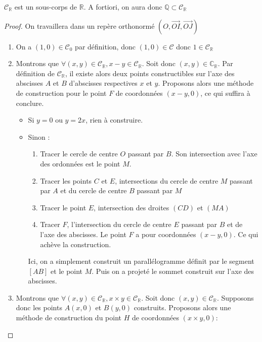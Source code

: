 \documentclass[a4paper,12pt,french,draft]{report}
\begin{document}
			
		\begin{proposition} \( \mathscr{C}_\mathbb{R} \) est un sous-corps de \(\mathbb{R}\). A fortiori, on aura donc \( \mathbb{Q} \subset \mathscr{C}_\mathbb{R} \)
		\end{proposition}
			\begin{proof}
				On travaillera dans un repère orthonormé $(O, \vec{OI}, \vec{OJ})$
				\begin{enumerate}
					\item On a $(1, 0) \in \mathscr{C}_0$ par définition, donc $(1, 0) \in \mathscr{C}$ donc $1 \in \mathscr{C}_\mathbb{R}$
					\item Montrons que $\forall (x, y) \in \mathscr{C}_\mathbb{R}, x-y \in \mathscr{C}_\mathbb{R}$. Soit donc $(x, y) \in \mathbb{C}_\mathbb{R}$. Par définition de $\mathscr{C}_\mathbb{R}$, il existe alors deux points constructibles sur l'axe des abscisses $A$ et $B$ d'abscisses respectives $x$ et $y$. Proposons alors une méthode de construction pour le point $F$ de coordonnées $(x-y, 0)$, ce qui suffira à conclure.
						\begin{itemize}
							\item Si $y = 0$ ou $y = 2x$, rien à construire.
							\item Sinon : 
								\begin{enumerate}
									\item Tracer le cercle de centre $O$ passant par $B$. Son intersection avec l'axe des ordonnées est le point $M$.
									\item Tracer les points $C$ et $E$, intersections du cercle de centre $M$ passant par $A$ et du cercle de centre $B$ passant par $M$
									\item Tracer le point $E$, intersection des droites $(CD)$ et $(MA)$
									\item Tracer $F$, l'intersection du cercle de centre $E$ passant par $B$ et de l'axe des abscisses. Le point $F$ a pour coordonnées $(x-y, 0)$. Ce qui achève la construction.	
								\end{enumerate}
								Ici, on a simplement construit un parallélogramme définit par le segment $[AB]$ et le point $M$. Puis on a projeté le sommet construit sur l'axe des abscisses.
						\end{itemize}
					\item Montrons que \( \forall (x, y) \in \mathscr{C}_\mathbb{R}, x \times y \in \mathscr{C}_\mathbb{R}\). Soit donc $(x, y) \in \mathscr{C}_\mathbb{R}$. Supposons donc les points $A (x, 0)$ et $B (y, 0)$ construits. Proposons alors une méthode de construction du point $H$ de coordonnées $(x\times y, 0)$:

\end{enumerate}
\end{proof}
\end{document}
